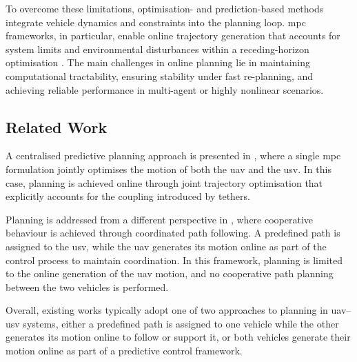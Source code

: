 To overcome these limitations, optimisation- and prediction-based methods integrate vehicle dynamics and constraints into the planning loop.
\gls{mpc} frameworks, in particular, enable online trajectory generation that accounts for system limits and environmental disturbances within a receding-horizon optimisation \cite{camachoModelPredictiveControl2007,rawlingsModelPredictiveControl2020}.
The main challenges in online planning lie in maintaining computational tractability, ensuring stability under fast re-planning, and achieving reliable performance in multi-agent or highly nonlinear scenarios.


\subsection{Related Work}

A centralised predictive planning approach is presented in \cite{novakCollaborativeObjectManipulation2024}, where a single \gls{mpc} formulation jointly optimises the motion of both the \gls{uav} and the \gls{usv}. In this case, planning is achieved online through joint trajectory optimisation that explicitly accounts for the coupling introduced by tethers.

Planning is addressed from a different perspective in \cite{zhangCooperativeControlFramework2025}, where cooperative behaviour is achieved through coordinated path following. A predefined path is assigned to the \gls{usv}, while the \gls{uav} generates its motion online as part of the control process to maintain coordination. In this framework, planning is limited to the online generation of the \gls{uav} motion, and no cooperative path planning between the two vehicles is performed.

Overall, existing works typically adopt one of two approaches to planning in \gls{uav}--\gls{usv} systems, either a predefined path is assigned to one vehicle while the other generates its motion online to follow or support it, or both vehicles generate their motion online as part of a predictive control framework.

